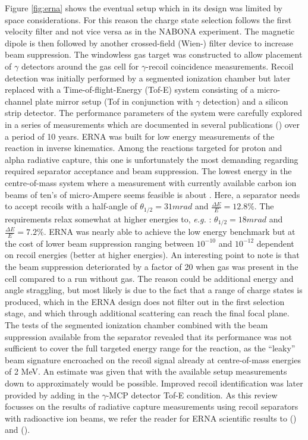 Figure \ref{fig:erna} shows the eventual setup which in its design was limited by space considerations. For this reason the charge state selection follows the first velocity filter and not vice versa as in the NABONA experiment. The magnetic dipole is then followed by another crossed-field (Wien-) filter device to increase beam suppression. The windowless gas target was constructed to allow placement of $\gamma$ detectors around the gas cell for $\gamma$-recoil coincidence measurements. Recoil detection was initially performed by a segmented ionization chamber but later replaced with a Time-of-flight-Energy (Tof-E) system consisting of a micro-channel plate mirror setup (Tof in conjunction with $\gamma$ detection) and a silicon strip detector. The performance parameters of the system were carefully explored in a series of measurements which are documented in several publications (\cite{roga99,roga03,gial04,schu04,dile08}) over a period of 10 years. ERNA was built for low energy measurements of the \reac{\alpha}{\gamma} reaction in inverse kinematics. Among the reactions targeted for proton and alpha radiative capture, this one is unfortunately the most demanding regarding required separator acceptance and beam suppression. The lowest energy in the centre-of-mass system where a measurement with currently available carbon ion beams of ten's of micro-Ampere seems feasible is about . Here, a separator needs to accept recoils with a half-angle of $\theta_{1/2} = 31 \unit{mrad}$ and $\frac{\Delta{}E}{E} = 12.8\%$. The requirements relax somewhat at higher energies to, {\it e.g.} : $\theta_{1/2} = 18 \unit{mrad}$ and $\frac{\Delta{}E}{E} = 7.2\%$. ERNA was nearly able to achieve the low energy benchmark but at the cost of lower beam suppression ranging between $10^{-10}$ and $10^{-12}$ dependent on recoil energies (better at higher energies). An interesting point to note is that the beam suppression deteriorated by a factor of 20 when gas was present in the cell compared to a run without gas. The reason could be additional energy and angle straggling, but most likely is due to the fact that a range of charge states is produced, which in the ERNA design does not filter out in the first selection stage, and which through additional scattering can reach the final focal plane. The tests of the segmented ionization chamber combined with the beam suppression available from the separator revealed that its performance was not sufficient to cover the full targeted energy range for the \reac{\alpha}{\gamma} reaction, as the ``leaky'' beam signature encroached on the  recoil signal already at centre-of-mass energies of 2 MeV. An estimate was given that with the available setup measurements down to approximately  would be possible. Improved recoil identification was later provided by adding in the $\gamma$-MCP detector Tof-E condition. As this review focusses on the results of radiative capture measurements using recoil separators with radioactive ion beams, we refer the reader for ERNA scientific results to \cite{schu05,schu05b} (\reac{\alpha}{\gamma}) and \cite{dile09} (\reac{\alpha}{\gamma}).
